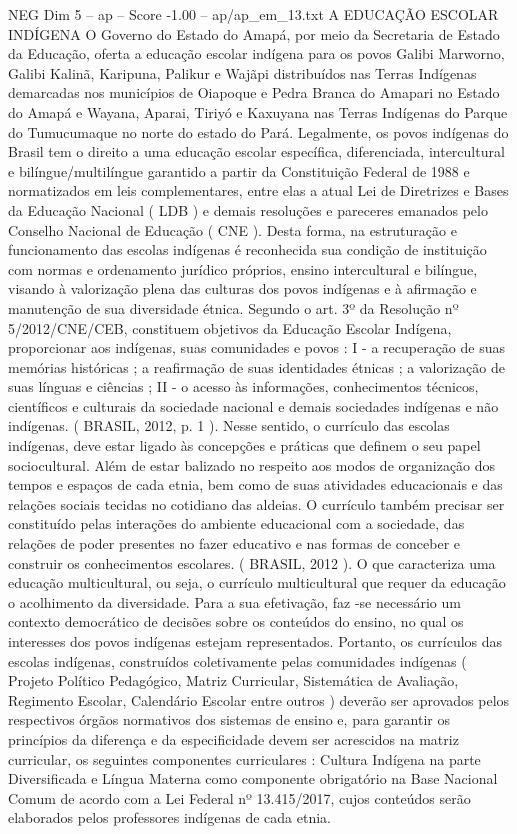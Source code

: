 \begin{textsample}{NEG Dim 5 – ap – Score -1.00 – ap/ap\_em\_13.txt}  \label{ex:f5_neg_126}
A EDUCAÇÃO ESCOLAR INDÍGENA O Governo do Estado do Amapá, por meio da Secretaria de Estado da Educação, oferta a educação escolar indígena para os povos Galibi Marworno, Galibi Kalinã, Karipuna, Palikur e Wajãpi distribuídos nas Terras Indígenas demarcadas nos municípios de Oiapoque e Pedra Branca do Amapari no Estado do Amapá e Wayana, Aparai, Tiriyó e Kaxuyana nas Terras Indígenas do Parque do Tumucumaque no norte do estado do Pará.
Legalmente, os povos indígenas do Brasil tem o direito a uma educação escolar específica, diferenciada, intercultural e bilíngue/multilíngue garantido a partir da Constituição Federal de 1988 e normatizados em leis complementares, entre elas a atual Lei de Diretrizes e Bases da Educação Nacional ( LDB ) e demais resoluções e pareceres emanados pelo Conselho Nacional de Educação ( CNE ).
Desta forma, na estruturação e funcionamento das escolas indígenas é reconhecida sua condição de instituição com normas e ordenamento jurídico próprios, ensino intercultural e bilíngue, visando à valorização plena das culturas dos povos indígenas e à afirmação e manutenção de sua diversidade étnica.
Segundo o art. 3º da Resolução nº 5/2012/CNE/CEB, constituem objetivos da Educação Escolar Indígena, proporcionar aos indígenas, suas comunidades e povos : I - a recuperação de suas memórias históricas ; a reafirmação de suas identidades étnicas ; a valorização de suas línguas e ciências ; II - o acesso às informações, conhecimentos técnicos, científicos e culturais da sociedade nacional e demais sociedades indígenas e não indígenas. ( BRASIL, 2012, p. 1 ).
Nesse sentido, o currículo das escolas indígenas, deve estar ligado às concepções e práticas que definem o seu papel sociocultural.
Além de estar balizado no respeito aos modos de organização dos tempos e espaços de cada etnia, bem como de suas atividades educacionais e das relações sociais tecidas no cotidiano das aldeias.
O currículo também precisar ser constituído pelas interações do ambiente educacional com a sociedade, das relações de poder presentes no fazer educativo e nas formas de conceber e construir os conhecimentos escolares. ( BRASIL, 2012 ).
O que caracteriza uma educação multicultural, ou seja, o currículo multicultural que requer da educação o acolhimento da diversidade.
Para a sua efetivação, faz -se necessário um contexto democrático de decisões sobre os conteúdos do ensino, no qual os interesses dos povos indígenas estejam representados.
Portanto, os currículos das escolas indígenas, construídos coletivamente pelas comunidades indígenas ( Projeto Político Pedagógico, Matriz Curricular, Sistemática de Avaliação, Regimento Escolar, Calendário Escolar entre outros ) deverão ser aprovados pelos respectivos órgãos normativos dos sistemas de ensino e, para garantir os princípios da diferença e da especificidade devem ser acrescidos na matriz curricular, os seguintes componentes curriculares : Cultura Indígena na parte Diversificada e Língua Materna como componente obrigatório na Base Nacional Comum de acordo com a Lei Federal nº 13.415/2017, cujos conteúdos serão elaborados pelos professores indígenas de cada etnia.

\end{textsample}

